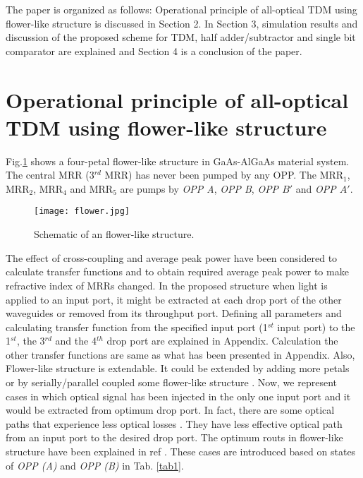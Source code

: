 \documentclass{osa-article}
\begin{document}
The paper is organized as follows: Operational principle of all-optical TDM using flower-like structure is discussed in Section 2. In Section 3, simulation results and discussion of the proposed scheme for TDM, half adder/subtractor and single bit comparator are explained and Section 4 is a conclusion of the paper.

\section{ Operational principle of all-optical TDM using flower-like structure}
\label{} 
Fig.\ref{fig1} shows a four-petal flower-like structure in GaAs-AlGaAs material system. The central MRR (3$^{rd}$ MRR) has never been pumped by any OPP. The MRR$_1$, MRR$_2$, MRR$_4$ and MRR$_5$ are pumps by \textit{OPP A}, \textit{OPP B}, \textit{OPP $B'$} and \textit{OPP $A'$}.
\begin{figure}[tb]
\centering
	\texttt{[image: flower.jpg]}
	\caption{Schematic of an flower-like structure.}
	\label{fig1}
\end{figure}
 The effect of cross-coupling and average peak power have been considered to calculate transfer functions and to obtain required average peak power to make refractive index of MRRs changed. In the proposed structure when light is applied to an input port, it might be extracted at each drop port of the other waveguides or removed from its throughput port. Defining all parameters and calculating transfer function from the specified input port (1$^{st}$ input port) to the 1$^{st}$, the 3$^{rd}$ and the 4$^{th}$ drop port are explained in Appendix. Calculation the other transfer functions are same as what has been presented in Appendix. Also, Flower-like structure is extendable. It could be extended by adding more petals or by serially/parallel coupled some flower-like structure \cite{razaghi2016design}. Now, we represent cases in which optical signal has been injected in the only one input port and it would be extracted from optimum drop port. In fact, there are some optical paths that experience less optical losses \cite{razaghi2016design}. They have less effective optical path from an input port to the desired drop port. The optimum routs in flower-like structure have been explained in ref \cite{razaghi2016design}. These cases are introduced based on states of \textit{OPP (A)} and \textit{OPP (B)} in Tab. \ref{tab1}.
\end{document}
